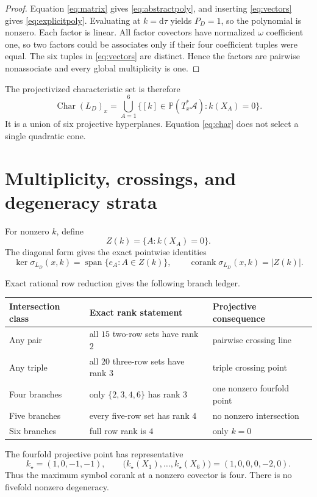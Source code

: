 \documentclass[11pt]{article}
\newcommand{\A}{\mathcal A}
\newcommand{\sigmaL}{\sigma_{L_D}}
\newcommand{\Char}{\operatorname{Char}}
\begin{document}
\begin{proof}
Equation \eqref{eq:matrix} gives \eqref{eq:abstractpoly}, and inserting
\eqref{eq:vectors} gives \eqref{eq:explicitpoly}.  Evaluating at
$k=\mathrm d\tau$ yields $P_D=1$, so the polynomial is nonzero.  Each factor
is linear.  All factor covectors have normalized $\omega$ coefficient one,
so two factors could be associates only if their four coefficient tuples were
equal.  The six tuples in \eqref{eq:vectors} are distinct.  Hence the factors
are pairwise nonassociate and every global multiplicity is one.
\end{proof}

The projectivized characteristic set is therefore
\begin{equation}
 \Char(L_D)_x
 =\bigcup_{A=1}^6\{[k]\in\mathbb P(T_x^*\A):k(X_A)=0\}.
 \label{eq:char}
\end{equation}
It is a union of six projective hyperplanes.  Equation \eqref{eq:char} does
not select a single quadratic cone.

\section{Multiplicity, crossings, and degeneracy strata}

For nonzero $k$, define
\begin{equation}
 Z(k)=\{A:k(X_A)=0\}.
 \label{eq:zeroset}
\end{equation}
The diagonal form gives the exact pointwise identities
\begin{equation}
 \ker\sigmaL(x,k)=\operatorname{span}\{e_A:A\in Z(k)\},
 \qquad
 \operatorname{corank}\sigmaL(x,k)=|Z(k)|.
 \label{eq:corank}
\end{equation}

Exact rational row reduction gives the following branch ledger.
\begin{center}
\small
\begin{tabular}{lll}
\toprule
Intersection class & Exact rank statement & Projective consequence\\
\midrule
Any pair & all $15$ two-row sets have rank $2$ & pairwise crossing line\\
Any triple & all $20$ three-row sets have rank $3$ & triple crossing point\\
Four branches & only $\{2,3,4,6\}$ has rank $3$ & one nonzero fourfold point\\
Five branches & every five-row set has rank $4$ & no nonzero intersection\\
Six branches & full row rank is $4$ & only $k=0$\\
\bottomrule
\end{tabular}
\end{center}
The fourfold projective point has representative
\begin{equation}
 k_\star=(1,0,-1,-1),
 \qquad
 \bigl(k_\star(X_1),\ldots,k_\star(X_6)\bigr)
 =(1,0,0,0,-2,0).
 \label{eq:fourfold}
\end{equation}
Thus the maximum symbol corank at a nonzero covector is four.  There is no
fivefold nonzero degeneracy.
\end{document}
